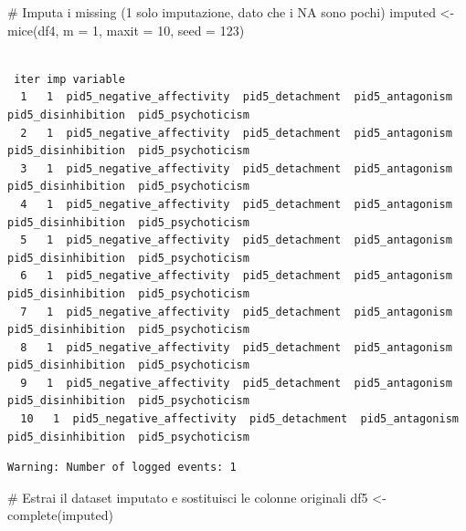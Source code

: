 \documentclass[
  11pt,
  a4paper,
  onecolumn]{article}
\newenvironment{Shaded}{}{}
\newcommand{\AttributeTok}[1]{\textcolor[rgb]{0.84,0.23,0.29}{#1}}
\newcommand{\CommentTok}[1]{\textcolor[rgb]{0.42,0.45,0.49}{#1}}
\newcommand{\DecValTok}[1]{\textcolor[rgb]{0.00,0.36,0.77}{#1}}
\newcommand{\FunctionTok}[1]{\textcolor[rgb]{0.44,0.26,0.76}{#1}}
\newcommand{\NormalTok}[1]{\textcolor[rgb]{0.14,0.16,0.18}{#1}}
\newcommand{\OtherTok}[1]{\textcolor[rgb]{0.44,0.26,0.76}{#1}}
\begin{document}
\begin{Shaded}
\begin{Highlighting}[]
\CommentTok{\# Imputa i missing (1 solo imputazione, dato che i NA sono pochi)}
\NormalTok{imputed }\OtherTok{\textless{}{-}} \FunctionTok{mice}\NormalTok{(df4, }\AttributeTok{m =} \DecValTok{1}\NormalTok{, }\AttributeTok{maxit =} \DecValTok{10}\NormalTok{, }\AttributeTok{seed =} \DecValTok{123}\NormalTok{)}
\end{Highlighting}
\end{Shaded}

\begin{verbatim}

 iter imp variable
  1   1  pid5_negative_affectivity  pid5_detachment  pid5_antagonism  pid5_disinhibition  pid5_psychoticism
  2   1  pid5_negative_affectivity  pid5_detachment  pid5_antagonism  pid5_disinhibition  pid5_psychoticism
  3   1  pid5_negative_affectivity  pid5_detachment  pid5_antagonism  pid5_disinhibition  pid5_psychoticism
  4   1  pid5_negative_affectivity  pid5_detachment  pid5_antagonism  pid5_disinhibition  pid5_psychoticism
  5   1  pid5_negative_affectivity  pid5_detachment  pid5_antagonism  pid5_disinhibition  pid5_psychoticism
  6   1  pid5_negative_affectivity  pid5_detachment  pid5_antagonism  pid5_disinhibition  pid5_psychoticism
  7   1  pid5_negative_affectivity  pid5_detachment  pid5_antagonism  pid5_disinhibition  pid5_psychoticism
  8   1  pid5_negative_affectivity  pid5_detachment  pid5_antagonism  pid5_disinhibition  pid5_psychoticism
  9   1  pid5_negative_affectivity  pid5_detachment  pid5_antagonism  pid5_disinhibition  pid5_psychoticism
  10   1  pid5_negative_affectivity  pid5_detachment  pid5_antagonism  pid5_disinhibition  pid5_psychoticism
\end{verbatim}

\begin{verbatim}
Warning: Number of logged events: 1
\end{verbatim}

\begin{Shaded}
\begin{Highlighting}[]
\CommentTok{\# Estrai il dataset imputato e sostituisci le colonne originali}
\NormalTok{df5 }\OtherTok{\textless{}{-}} \FunctionTok{complete}\NormalTok{(imputed)}
\end{Highlighting}
\end{Shaded}
\end{document}
